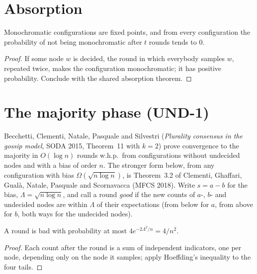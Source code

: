 \section{Absorption}
\begin{theorem}\label{thm:absorbed}
\leanok{}
Monochromatic configurations are fixed points, and from every configuration the probability of
not being monochromatic after $t$ rounds tends to $0$.
\end{theorem}
\begin{proof}\leanok
If some node $w$ is decided, the round in which everybody samples $w$, repeated twice, makes the
configuration monochromatic; it has positive probability. Conclude with the shared absorption
theorem.
\end{proof}

\section{The majority phase (UND-1)}\label{sec:cggnps-majority}
Becchetti, Clementi, Natale, Pasquale and Silvestri (\emph{Plurality consensus in the gossip
model}, SODA 2015, Theorem~11 with $k=2$) prove convergence to the majority in $O(\log n)$ rounds
w.h.p.\ from configurations without undecided nodes and with a bias of order $n$. The stronger
form below, from any configuration with bias $\Omega(\sqrt{n\log n})$, is Theorem~3.2 of Clementi,
Ghaffari, Gual\`a, Natale, Pasquale and Scornavacca (MFCS 2018). Write $s=a-b$ for the bias,
$\Lambda=\sqrt{n\log n}$, and call a round \emph{good} if the new counts of $a$-, $b$- and
undecided nodes are within $\Lambda$ of their expectations (from below for $a$, from above for
$b$, both ways for the undecided nodes).

\begin{lemma}\label{lem:badround}
\leanok{}
A round is bad with probability at most $4e^{-2\Lambda^2/n}=4/n^2$.
\end{lemma}
\begin{proof}\leanok
Each count after the round is a sum of independent indicators, one per node, depending only on
the node it samples; apply Hoeffding's inequality to the four tails.
\end{proof}

